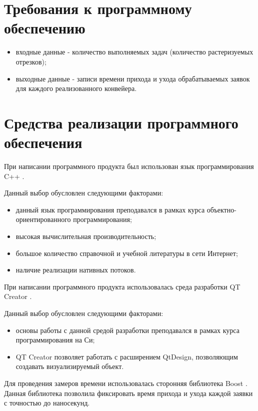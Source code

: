 \documentclass[12pt]{report}
\begin{document}
\section{Требования к программному обеспечению}
\begin{itemize}
\item входные данные - количество выполняемых задач (количество растеризуемых отрезков);
\item выходные данные - записи времени прихода и ухода обрабатываемых заявок для каждого реализованного конвейера.
\end{itemize}

\section{Средства реализации программного обеспечения}
При написании программного продукта был использован язык программирования C++ \cite{Cpp}.

Данный выбор обусловлен следующими факторами:
\begin{itemize}
\item данный язык программирования преподавался в рамках курса объектно-ориентированного программирования;
\item высокая вычислительная производительность;
\item большое количество справочной и учебной литературы в сети Интернет;
\item наличие реализации нативных потоков.
\end{itemize}

При написании программного продукта использовалась среда разработки QT Creator \cite{QT}.

Данный выбор обусловлен следующими факторами:
\begin{itemize}
\item основы работы с данной средой разработки преподавался в рамках курса программирования на Си;
\item QT Creator позволяет работать с расширением QtDesign, позволяющим создавать визуализируемый объект.
\end{itemize}

Для проведения замеров времени использовалась сторонняя библиотека Boost \cite{Boost}. Данная библиотека позволила фиксировать время прихода и ухода каждой заявки с точностью до наносекунд.
\end{document}
